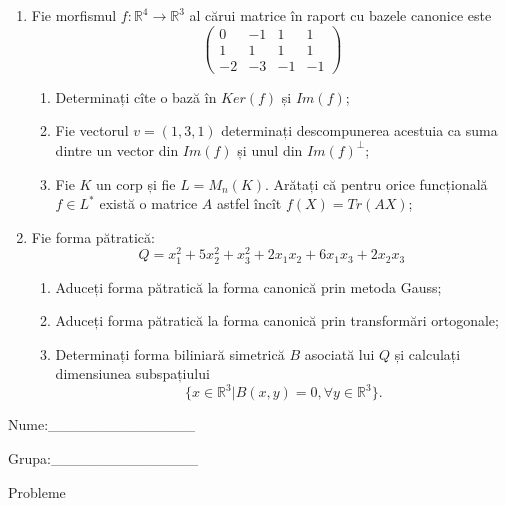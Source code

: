 \documentclass{article}
\begin{document}
\begin{enumerate}
 \item Fie morfismul $f:\mathbb{R}^4 \to \mathbb{R}^3$ al cărui matrice în raport cu bazele canonice este
$$\begin{pmatrix}
0&-1&1&1\\
1&1&1&1\\
-2&-3&-1&-1
\end{pmatrix}$$

\begin{enumerate}
\item Determinați cîte o bază în $Ker(f)$ și $Im(f)$;
\item Fie vectorul $v=(1,3,1)$ determinați descompunerea acestuia ca suma dintre un vector din $Im(f)$ și unul din $Im(f)^\perp$;
\item Fie $K$ un corp și fie $L=M_n(K)$. Arătați că pentru orice funcțională $f \in L^*$ există o matrice $A$ astfel încît $f(X)=Tr(AX)$;
\end{enumerate}
\item Fie forma pătratică:
$$Q= x_1^2+5x_2^2+x_3^2+2x_1x_2+6x_1x_3+2x_2x_3$$

\begin{enumerate}
\item Aduceți forma pătratică la forma canonică prin metoda Gauss;
\item Aduceți forma pătratică la forma canonică prin transformări ortogonale;
\item Determinați forma biliniară simetrică $B$ asociată lui $Q$ și calculați dimensiunea subspațiului
$$\{x \in \mathbb{R}^3 | B(x,y)=0,\forall y \in \mathbb{R}^3\}.$$

\end{enumerate}
\end{enumerate}
\newpage
\begin{flushright}
Nume:\_\_\_\_\_\_\_\_\_\_\_\_\_\_
 
 
Grupa:\_\_\_\_\_\_\_\_\_\_\_\_\_\_
\end{flushright}
\begin{center}
\vspace{2cm}
{\Large Probleme}
\vspace{2cm}
\end{center}
\end{document}

